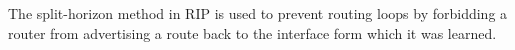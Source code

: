 The split-horizon method in RIP is used to prevent routing loops by forbidding a router from advertising a route back to the interface form which it was learned.
